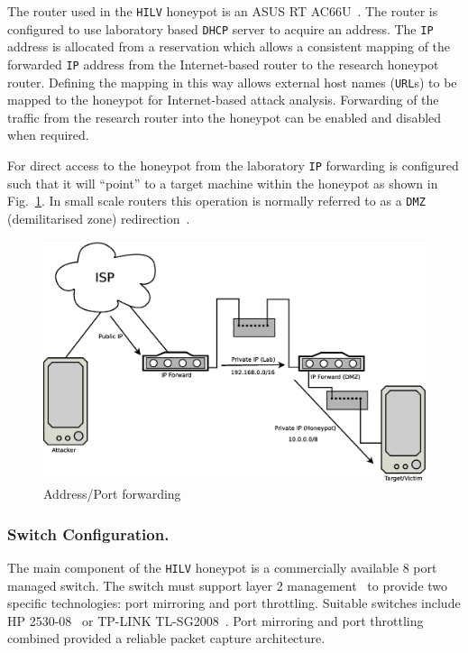 \documentclass{llncs}
\begin{document}
The router used in the \texttt{HILV} honeypot is an ASUS RT
AC66U~\cite{ASUS:17}. The router is configured to use laboratory based
\texttt{DHCP} server to acquire an  address. The \texttt{IP} address is
allocated from a reservation which allows a consistent mapping of the forwarded
\texttt{IP} address from the Internet-based router to the research honeypot
router. Defining the mapping in this way allows external host names
(\texttt{URL}s) to be mapped to the honeypot for Internet-based attack
analysis. Forwarding of the traffic from the research router into the honeypot
can be enabled and disabled when required.

For direct access to the honeypot from the laboratory \texttt{IP} forwarding is
configured such that it will ``point'' to a target machine within the honeypot
as shown in Fig.~\ref{fig:Forward}. In small scale routers this operation is
normally referred to as a \texttt{DMZ} (demilitarised zone)
redirection~\cite{DK:08,MB:01}.

\begin{figure}[h]
\begin{center}
	\includegraphics[scale=0.25]{Images/Forward.eps}
\caption{Address/Port forwarding}
\label{fig:Forward}
\end{center}
\end{figure}

\subsubsection{Switch Configuration.}

The main component of the \texttt{HILV} honeypot is a commercially available 8
port managed switch. The switch must support layer 2 management~\cite{ST:98} to
provide two specific technologies: port mirroring and port throttling. Suitable
switches include HP 2530-08~\cite{HP:17} or TP-LINK TL-SG2008~\cite{TP:17}.
Port mirroring and port throttling combined provided a reliable packet capture
architecture. 
\end{document}
